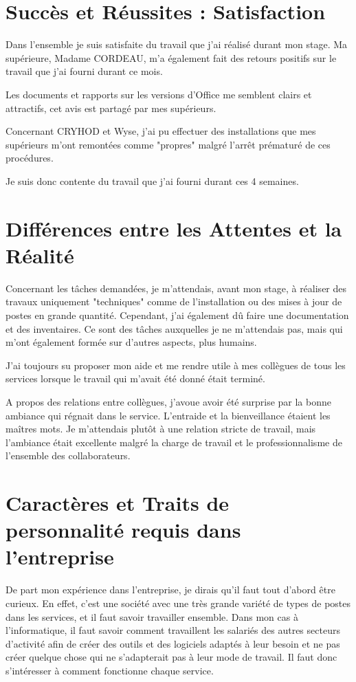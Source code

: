 \section{Succès et Réussites : Satisfaction}

Dans l'ensemble je suis satisfaite du travail que j'ai réalisé durant mon stage. Ma supérieure, Madame CORDEAU, m'a également fait des retours positifs sur le travail que j'ai fourni durant ce mois.

Les documents et rapports sur les versions d'Office me semblent clairs et attractifs, cet avis est partagé par mes supérieurs.

Concernant CRYHOD et Wyse, j'ai pu effectuer des installations que mes supérieurs m'ont remontées comme "propres" malgré l'arrêt prématuré de ces procédures.

Je suis donc contente du travail que j'ai fourni durant ces 4 semaines.


\section{Différences entre les Attentes et la Réalité}

Concernant les tâches demandées, je m’attendais, avant mon stage, à réaliser des travaux uniquement "techniques" comme de l’installation ou des mises à jour de postes en grande quantité. Cependant, j’ai également dû faire une documentation et des inventaires. Ce sont des tâches auxquelles je ne m’attendais pas, mais qui m’ont également formée sur d’autres aspects, plus humains.

J’ai toujours su proposer mon aide et me rendre utile à mes collègues de tous les services lorsque le travail qui m’avait été donné était terminé.

A propos des relations entre collègues, j’avoue avoir été surprise par la bonne ambiance qui régnait dans le service. L’entraide et la bienveillance étaient les maîtres mots. Je m’attendais plutôt à une relation stricte de travail, mais l’ambiance était excellente malgré la charge de travail et le professionnalisme de l’ensemble des collaborateurs.


\section{Caractères et Traits de personnalité requis dans l'entreprise}

De part mon expérience dans l'entreprise, je dirais qu'il faut tout d'abord être curieux. En effet, c'est une société avec une très grande variété de types de postes dans les services, et il faut savoir travailler ensemble.
Dans mon cas à l'informatique, il faut savoir comment travaillent les salariés des autres secteurs d'activité afin de créer des outils et des logiciels adaptés à leur besoin et ne pas créer quelque chose qui ne s'adapterait pas à leur mode de travail.
Il faut donc s'intéresser à comment fonctionne chaque service.\newline

